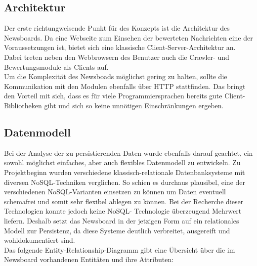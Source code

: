 \subsection{Architektur}
Der erste richtungweisende Punkt für des Konzepts ist die Architektur des Newsboards.
Da eine Webseite zum Einsehen der bewerteten Nachrichten eine der Voraussetzungen ist,
bietet sich eine klassische Client-Server-Architektur an.
Dabei treten neben den Webbrowsern des Benutzer auch die Crawler-
und Bewertungsmodule als Clients auf. \\

Um die Komplexität des Newsboads möglichst gering zu halten, sollte die Kommunikation
mit den Modulen ebenfalls über HTTP stattfinden. Das bringt den Vorteil mit sich,
dass es für viele Programmiersprachen bereits gute Client-Bibliotheken gibt
und sich so keine unnötigen Einschränkungen ergeben.

\subsection{Datenmodell}
Bei der Analyse der zu persistierenden Daten wurde ebenfalls darauf geachtet, ein
sowohl möglichst einfaches, aber auch flexibles Datenmodell zu entwickeln. Zu Projektbeginn wurden verschiedene klassisch-relationale Datenbanksysteme mit diversen 
NoSQL-Techniken verglichen. So schien es durchaus plausibel, eine der verschiedenen
NoSQL-Varianten einsetzen zu können um Daten eventuell schemafrei und somit sehr flexibel 
ablegen zu können. Bei der Recherche dieser Technologien konnte jedoch keine NoSQL-
Technologie überzeugend Mehrwert liefern. Deshalb setzt das Newsboard in der jetzigen Form 
auf ein relationales Modell zur Persistenz, da diese Systeme deutlich 
verbreitet, ausgereift und wohldokumentiert sind. \\

Das folgende Entity-Relationship-Diagramm gibt eine Übersicht über die im Newsboard
vorhandenen Entitäten und ihre Attributen:

